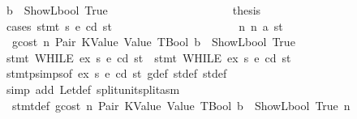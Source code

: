 \begin{isabellebody}
\ {\isachardoublequoteopen}b\ {\isacharequal}{\kern0pt}\ ShowL\isactrlsub b\isactrlsub o\isactrlsub o\isactrlsub l\ True{\isachardoublequoteclose}\isanewline
\ \ \ \ \ \ \ \ \ \ \ \ \ \ \ \ \ \ \isamarkupfalse%
\ \isamarkupfalse%
\ {\isacharquery}{\kern0pt}thesis\isanewline
\ \ \ \ \ \ \ \ \ \ \ \ \ \ \ \ \ \ \isamarkupfalse%
\ {\isacharparenleft}{\kern0pt}cases\ {\isachardoublequoteopen}stmt\ s{}\ e\ cd\ st{\isacharprime}{\kern0pt}{\isacharprime}{\kern0pt}{\isachardoublequoteclose}{\isacharparenright}{\kern0pt}\isanewline
\ \ \ \ \ \ \ \ \ \ \ \ \ \ \ \ \ \ \ \ \isamarkupfalse%
\ n{}{\isacharcolon}{\kern0pt}\ {\isacharparenleft}{\kern0pt}n\ a\ st{\isacharprime}{\kern0pt}{\isacharprime}{\kern0pt}{\isacharprime}{\kern0pt}{\isacharparenright}{\kern0pt}\isanewline
\ \ \ \ \ \ \ \ \ \ \ \ \ \ \ \ \ \ \ \ \isamarkupfalse%
\ {}{\isacharparenleft}{\kern0pt}{}{\isacharparenright}{\kern0pt}\ gcost\ n\ Pair\ KValue\ Value\ TBool\ {\isacharbackquoteopen}b\ {\isacharequal}{\kern0pt}\ ShowL\isactrlsub b\isactrlsub o\isactrlsub o\isactrlsub l\ True{\isacharbackquoteclose}\ \isamarkupfalse%
\ {\isachardoublequoteopen}stmt\ {\isacharparenleft}{\kern0pt}WHILE\ ex\ s{}{\isacharparenright}{\kern0pt}\ e\ cd\ st\ {\isacharequal}{\kern0pt}\ stmt\ {\isacharparenleft}{\kern0pt}WHILE\ ex\ s{}{\isacharparenright}{\kern0pt}\ e\ cd\ st{\isacharprime}{\kern0pt}{\isacharprime}{\kern0pt}{\isacharprime}{\kern0pt}{\isachardoublequoteclose}\ \isamarkupfalse%
\ stmt{\isachardot}{\kern0pt}psimps{\isacharparenleft}{\kern0pt}{}{\isacharparenright}{\kern0pt}{\isacharbrackleft}{\kern0pt}of\ ex\ s{}\ e\ cd\ st{\isacharbrackright}{\kern0pt}\ g{\isacharunderscore}{\kern0pt}def\ st{\isacharprime}{\kern0pt}{\isacharunderscore}{\kern0pt}def\ st{\isacharprime}{\kern0pt}{\isacharprime}{\kern0pt}{\isacharunderscore}{\kern0pt}def\ \isamarkupfalse%
\ {\isacharparenleft}{\kern0pt}simp\ add{\isacharcolon}{\kern0pt}\ Let{\isacharunderscore}{\kern0pt}def\ split{\isacharcolon}{\kern0pt}unit{\isachardot}{\kern0pt}split{\isacharunderscore}{\kern0pt}asm{\isacharparenright}{\kern0pt}\isanewline
\ \ \ \ \ \ \ \ \ \ \ \ \ \ \ \ \ \ \ \ \isamarkupfalse%
\ {}{\isacharparenleft}{\kern0pt}{}{\isacharparenright}{\kern0pt}\ stmt{\isacharunderscore}{\kern0pt}def\ gcost\ n{}\ Pair\ KValue\ Value\ TBool\ {\isacharbackquoteopen}b\ {\isacharequal}{\kern0pt}\ ShowL\isactrlsub b\isactrlsub o\isactrlsub o\isactrlsub l\ True{\isacharbackquoteclose}\ n\ \isamarkupfalse%

\end{isabellebody}
